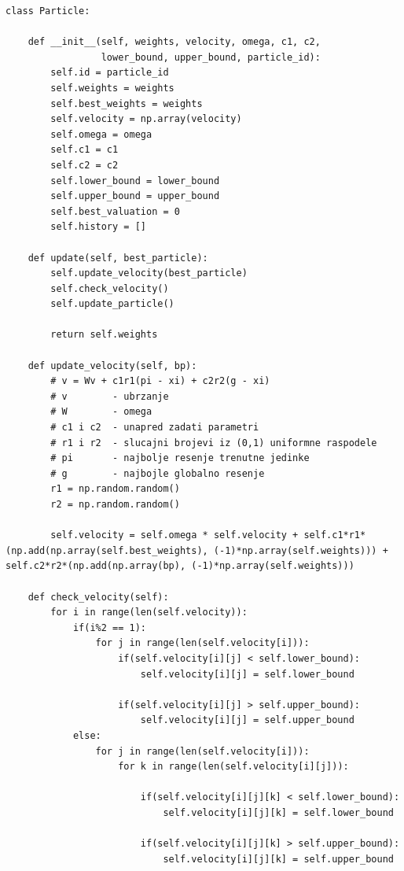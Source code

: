 \documentclass[a4paper]{article}
\begin{document}
\begin{lstlisting}
class Particle:
    
    def __init__(self, weights, velocity, omega, c1, c2, 
                 lower_bound, upper_bound, particle_id):
        self.id = particle_id
        self.weights = weights
        self.best_weights = weights
        self.velocity = np.array(velocity)
        self.omega = omega
        self.c1 = c1
        self.c2 = c2
        self.lower_bound = lower_bound
        self.upper_bound = upper_bound
        self.best_valuation = 0
        self.history = []
        
    def update(self, best_particle):
        self.update_velocity(best_particle)
        self.check_velocity()
        self.update_particle()
        
        return self.weights
    
    def update_velocity(self, bp):
        # v = Wv + c1r1(pi - xi) + c2r2(g - xi)
        # v        - ubrzanje 
        # W        - omega 
        # c1 i c2  - unapred zadati parametri
        # r1 i r2  - slucajni brojevi iz (0,1) uniformne raspodele
        # pi       - najbolje resenje trenutne jedinke
        # g        - najbojle globalno resenje
        r1 = np.random.random()
        r2 = np.random.random()
        
        self.velocity = self.omega * self.velocity + self.c1*r1*(np.add(np.array(self.best_weights), (-1)*np.array(self.weights))) + self.c2*r2*(np.add(np.array(bp), (-1)*np.array(self.weights))) 
        
    def check_velocity(self):
        for i in range(len(self.velocity)):
            if(i%2 == 1):
                for j in range(len(self.velocity[i])): 
                    if(self.velocity[i][j] < self.lower_bound):
                        self.velocity[i][j] = self.lower_bound
                    
                    if(self.velocity[i][j] > self.upper_bound): 
                        self.velocity[i][j] = self.upper_bound
            else: 
                for j in range(len(self.velocity[i])):
                    for k in range(len(self.velocity[i][j])):
            
                        if(self.velocity[i][j][k] < self.lower_bound):
                            self.velocity[i][j][k] = self.lower_bound
                
                        if(self.velocity[i][j][k] > self.upper_bound): 
                            self.velocity[i][j][k] = self.upper_bound
        

\end{lstlisting}
\end{document}
